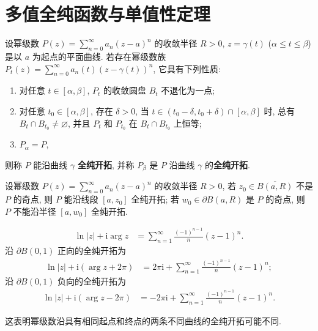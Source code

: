 \documentclass[../../main.tex]{subfiles}%
\begin{document}
\section{多值全纯函数与单值性定理}

\begin{definition}
设幂级数 \(P(z)=\sum\limits_{n=0}^{\infty} a_n(z-a)^n\) 的收敛半径 \(R>0\), \(z=\gamma(t)\) (\(\alpha\leqslant t\leqslant \beta\)) 是以 \(a\) 为起点的平面曲线. 若存在幂级数族 \(P_t(z)=\sum\limits_{n=0}^{\infty} a_n(t)(z-\gamma(t))^n\), 它具有下列性质:
\begin{enumerate}[(1)]
\item 对任意 \(t\in[\alpha,\beta]\), \(P_t\) 的收敛圆盘 \(B_t\) 不退化为一点;
\item 对任意 \(t_0\in[\alpha,\beta]\), 存在 \(\delta>0\), 当 \(t\in(t_0-\delta,t_0+\delta)\cap[\alpha,\beta]\) 时, 总有 \(B_t\cap B_{t_0}\neq\varnothing\), 并且 \(P_t\) 和 \(P_{t_0}\) 在 \(B_t\cap B_{t_0}\) 上恒等;
\item \(P_\alpha=P\),
\end{enumerate}
则称 \(P\) 能沿曲线 \(\gamma\) \textbf{全纯开拓}, 并称 \(P_\beta\) 是 \(P\) 沿曲线 \(\gamma\) 的\textbf{全纯开拓}.
\end{definition}

\begin{examples}
设幂级数 \(P(z)=\sum\limits_{n=0}^{\infty} a_n(z-a)^n\) 的收敛半径 \(R>0\), 若 \(z_0\in \overline{B(a,R)}\) 不是 \(P\) 的奇点, 则 \(P\) 能沿线段 \([a,z_0]\) 全纯开拓; 若 \(w_0\in \partial B(a,R)\) 是 \(P\) 的奇点, 则 \(P\) 不能沿半径 \([a,w_0]\) 全纯开拓.
\end{examples}

\begin{examples}
\begin{align*}
\ln|z| + \mathrm{i}\arg z &= \sum_{n=1}^{\infty} \frac{(-1)^{n-1}}{n} (z-1)^n.
\end{align*}
沿 \(\partial B(0,1)\) 正向的全纯开拓为
\begin{align*}
\ln|z| + \mathrm{i}(\arg z + 2\pi) &= 2\pi\mathrm{i} + \sum_{n=1}^{\infty} \frac{(-1)^{n-1}}{n} (z-1)^n;
\end{align*}
沿 \(\partial B(0,1)\) 负向的全纯开拓为
\begin{align*}
\ln|z| + \mathrm{i}(\arg z - 2\pi) &= - 2\pi\mathrm{i} + \sum_{n=1}^{\infty} \frac{(-1)^{n-1}}{n} (z-1)^n.
\end{align*}
\end{examples}
\begin{remark}
这表明幂级数沿具有相同起点和终点的两条不同曲线的全纯开拓可能不同.
\end{remark}
\end{document}
